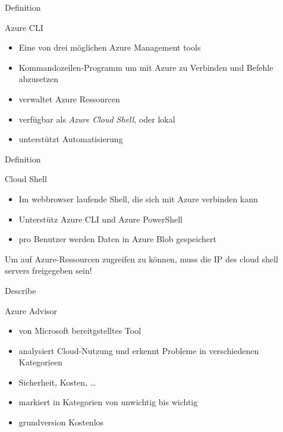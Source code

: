 \documentclass{scrartcl}
\newenvironment{flashcard}[2][]{%
    #1
    \vfill
    \centerline{\Large{#2}}
    \vfill
\newpage
}
{\newpage}
\begin{document}
    \begin{flashcard}[Definition]{Azure CLI}
        \begin{itemize}
            \item Eine von drei möglichen Azure Management tools
            \item Kommandozeilen-Programm um mit Azure zu Verbinden und Befehle abzusetzen
            \item verwaltet Azure Ressourcen
            \item verfügbar als \emph{Azure Cloud Shell}, oder lokal
            \item unterstützt Automatisierung
        \end{itemize}
    \end{flashcard}

    \begin{flashcard}[Definition]{Cloud Shell}
        \begin{itemize}
            \item Im webbrowser laufende Shell, die sich mit Azure verbinden kann
            \item Unterstütz Azure CLI und Azure PowerShell
            \item pro Benutzer werden Daten in Azure Blob gespeichert
        \end{itemize}

        \vspace{5mm}
        Um auf Azure-Ressourcen zugreifen zu können, muss die IP des cloud shell servers freigegeben sein!
    \end{flashcard}

    \begin{flashcard}[Describe]{Azure Advisor}
        \begin{itemize}
            \item von Microsoft bereitgstelltes Tool
            \item analysiert Cloud-Nutzung und erkennt Probleme in verschiedenen Kategorieen
            \item Sicherheit, Kosten, \ldots
            \item markiert in Kategorien von unwichtig bis wichtig
            \item grundversion Kostenlos
        \end{itemize}

    \end{flashcard}
\end{document}
